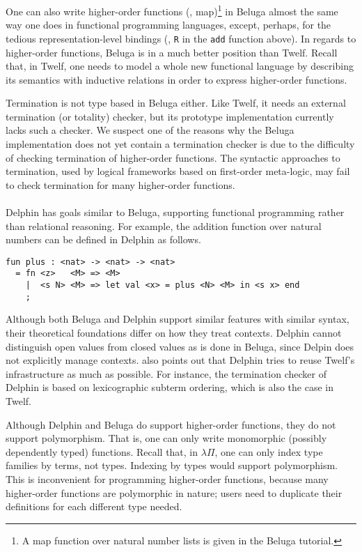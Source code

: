 One can also write higher-order functions (\eg, map)\footnote{
        A map function over natural number lists is
        given in the Beluga tutorial. }
in Beluga almost the same way one does in functional programming languages,
except, perhaps, for the tedious representation-level bindings 
(\eg, \verb|R| in the \verb|add| function above).
In regards to higher-order functions, Beluga is in a much better position
than Twelf. Recall that, in Twelf, one needs to model a whole new
functional language by describing its semantics with inductive relations
in order to express higher-order functions.

Termination is not type based in Beluga either. Like Twelf, it needs
an external termination (or totality) checker, but its prototype
implementation currently lacks such a checker. We suspect one of the reasons
why the Beluga implementation does not yet contain a termination checker is
due to the difficulty of checking termination of higher-order functions.
The syntactic approaches to termination, used by logical frameworks
based on first-order meta-logic, may fail to check termination for
many higher-order functions.

\paragraph{}
Delphin \cite{pos08phd} has goals similar to Beluga,
supporting functional programming rather than relational reasoning.
For example, the addition function over natural numbers can be defined
in Delphin as follows.\vspace{-2em}
\begin{singlespace}
\begin{verbatim}
fun plus : <nat> -> <nat> -> <nat> 
  = fn <z>   <M> => <M>
    |  <s N> <M> => let val <x> = plus <N> <M> in <s x> end
    ;
\end{verbatim}
\end{singlespace}\noindent
Although both Beluga and Delphin support similar features with similar syntax,
their theoretical foundations differ \cite{Pie10} on how they treat contexts.
Delphin cannot distinguish open values from closed values as is done in Beluga,
since Delpin does not explicitly manage contexts.
\citet{Pie10} also points out that Delphin tries to reuse Twelf's infrastructure
as much as possible. For instance, the termination checker of Delphin is
based on lexicographic subterm ordering, which is also the case in Twelf.

Although Delphin and Beluga do support higher-order functions,
they do not support polymorphism. That is, one can only write
monomorphic (possibly dependently typed) functions. Recall that,
in $\lambda\Pi$, one can only index type families by terms, not types.
Indexing by types would support polymorphism.
This is inconvenient for programming higher-order functions,
because many higher-order functions are polymorphic in nature; users
need to duplicate their definitions for each different type needed.

